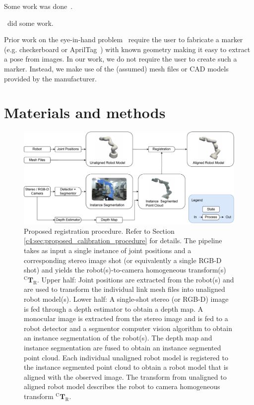 Some work was done~\citep{Li_2021}.

\cite{Bhat_2021_CVPR}~did some work.

Prior work on the eye-in-hand problem~\cite{Horaud95, Strobl06} require the user to fabricate a marker (e.g. checkerboard or AprilTag~\cite{Olson11}) with known geometry making it easy to extract a pose from images.
In our work, we do not require the user to create such a marker.
Instead, we make use of the (assumed) mesh files or CAD models provided by the manufacturer.

\section{Materials and methods}
\label{c4:sec:materials_and_methods}
\begin{figure}
    \centering
    \includegraphics[width=\textwidth]{fig/pipeline_refined.pdf}
    \caption{Proposed registration procedure. Refer to Section \ref{c4:sec:proposed_calibration_procedure} for details. The pipeline takes as input a single instance of joint positions and a corresponding stereo image shot (or equivalently a single RGB-D shot) and yields the robot(s)-to-camera homogeneous transform(s) $^\text{C}\mathbf{T}_\text{R}$. Upper half: Joint positions are extracted from the robot(s) and are used to transform the individual link mesh files into unaligned robot model(s).
    Lower half:
    A single-shot stereo (or RGB-D) image is fed through a depth estimator to obtain a depth map.
    A monocular image is extracted from the stereo image and is fed to a robot detector and a segmentor computer vision algorithm to obtain an instance segmentation of the robot(s).
    The depth map and instance segmentation are fused to obtain an instance segmented point cloud.
    Each individual unaligned robot model is registered to the instance segmented point cloud to obtain a robot model that is aligned with the observed image. The transform from unaligned to aligned robot model describes the robot to camera homogeneous transform $^\text{C}\mathbf{T}_\text{R}$.}
    \label{c4:fig:calibration_pipeline}
\end{figure}
